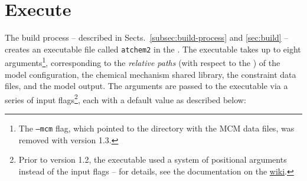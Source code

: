 \section{Execute} \label{sec:execute}

The build process -- described in Sects.~\ref{subsec:build-process} and \ref{sec:build} --
creates an executable file called \texttt{atchem2} in the \maindir. The executable takes up to
eight arguments\footnote{The \texttt{--mcm} flag, which pointed to the directory with the MCM
  data files, was removed with version 1.3.}, corresponding to the \emph{relative paths} (with
respect to the \maindir) of the model configuration, the chemical mechanism shared library, the
constraint data files, and the model output. The arguments are passed to the executable via a
series of input flags\footnote{Prior to version 1.2, the executable used a system of
  positional arguments instead of the input flags -- for details, see the documentation on the
  \href{https://github.com/AtChem/AtChem2/wiki/How-to-run-AtChem2}{wiki}.}, each with a default
value as described below:

